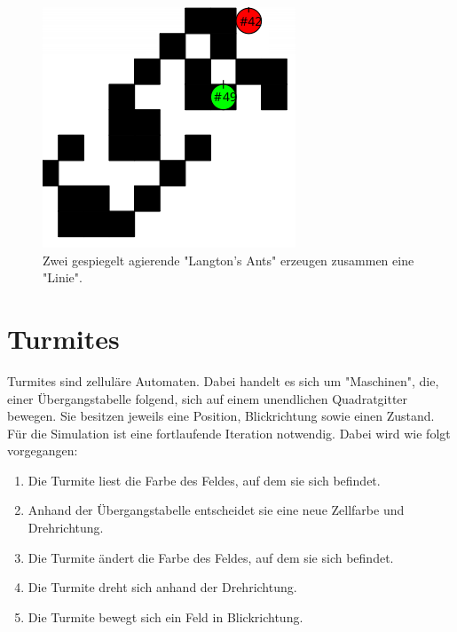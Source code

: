 \begin{figure}[!htb]
    \endminipage\hfill
      \includegraphics[width=\linewidth]{three.png}
    \endminipage

    \caption{Zwei gespiegelt agierende "Langton's Ants" erzeugen zusammen eine "Linie".}
\end{figure}


\section{Turmites}
Turmites sind zelluläre Automaten. Dabei handelt es sich um "Maschinen", die, einer Übergangstabelle folgend, sich auf einem unendlichen Quadratgitter bewegen. \cite{turmites} Sie besitzen jeweils eine Position, Blickrichtung sowie einen Zustand. Für die Simulation ist eine fortlaufende Iteration notwendig. Dabei wird wie folgt vorgegangen:
\begin{enumerate}
    \item Die Turmite liest die Farbe des Feldes, auf dem sie sich befindet.
    \item Anhand der Übergangstabelle entscheidet sie eine neue Zellfarbe und Drehrichtung.
    \item Die Turmite ändert die Farbe des Feldes, auf dem sie sich befindet.
    \item Die Turmite dreht sich anhand der Drehrichtung.
    \item Die Turmite bewegt sich ein Feld in Blickrichtung.
\end{enumerate}


